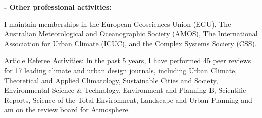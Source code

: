 \textbf{- Other professional activities:}

I maintain memberships in the European Geosciences Union (EGU), The Australian Meteorological and Oceanographic Society (AMOS), The International Association for Urban Climate (ICUC), and the Complex Systems Society (CSS).

Article Referee Activities: In the past 5 years, I have performed 45 peer reviews for 17 leading climate and urban design journals, including Urban Climate, Theoretical and Applied Climatology, Sustainable Cities and Society, Environmental Science \& Technology, Environment and Planning B, Scientific Reports, Science of the Total Environment, Landscape and Urban Planning and am on the review board for Atmosphere.




%
